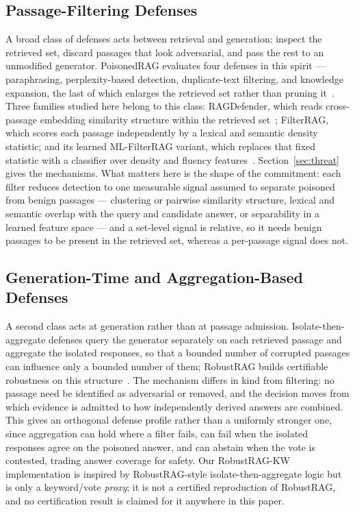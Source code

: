 \documentclass[conference]{IEEEtran}
\begin{document}
\subsection{Passage-Filtering Defenses}
A broad class of defenses acts between retrieval and generation: inspect the
retrieved set, discard passages that look adversarial, and pass the rest to an
unmodified generator. PoisonedRAG evaluates four defenses in this spirit ---
paraphrasing, perplexity-based detection, duplicate-text filtering, and knowledge
expansion, the last of which enlarges the retrieved set rather than pruning
it~\cite{zou2025poisonedrag}. Three
families studied here belong to this class: RAGDefender, which reads cross-passage
embedding similarity structure within the retrieved
set~\cite{kim2025ragdefender}; FilterRAG, which scores each passage independently
by a lexical and semantic density statistic; and its learned ML-FilterRAG variant,
which replaces that fixed statistic with a classifier over density and fluency
features~\cite{edemacu2025filterrag}. Section~\ref{sec:threat} gives the
mechanisms. What matters here is the shape of the commitment: each filter reduces
detection to one measurable signal assumed to separate poisoned from benign
passages --- clustering or pairwise similarity structure, lexical and semantic
overlap with the query and candidate answer, or separability in a learned feature
space --- and a set-level signal is relative, so it needs benign passages to be
present in the retrieved set, whereas a per-passage signal does not.

\subsection{Generation-Time and Aggregation-Based Defenses}
A second class acts at generation rather than at passage admission.
Isolate-then-aggregate defenses query the generator separately on each retrieved
passage and aggregate the isolated responses, so that a bounded number of
corrupted passages can influence only a bounded number of them; RobustRAG builds
certifiable robustness on this structure~\cite{xiang2024robustrag}. The mechanism
differs in kind from filtering: no passage need be identified as adversarial or
removed, and the decision moves from which evidence is admitted to how
independently derived answers are combined. This gives an orthogonal defense
profile rather than a uniformly stronger one, since aggregation can hold where a
filter fails, can fail when the isolated responses agree on the poisoned answer,
and can abstain when the vote is contested, trading answer coverage for safety.
Our RobustRAG-KW implementation is inspired by RobustRAG-style
isolate-then-aggregate logic but is only a keyword/vote \emph{proxy}; it is not a
certified reproduction of RobustRAG, and no certification result is claimed for
it anywhere in this paper.
\end{document}
